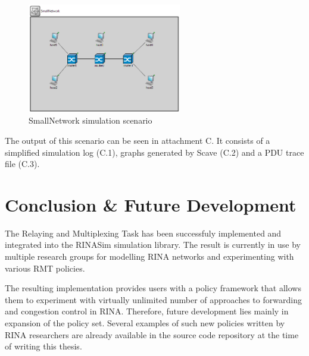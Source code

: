         \begin{figure}[H]
            \begin{center}
                \includegraphics[width=0.6\textwidth]{fig/examples-smallnetwork.png}
              \caption{SmallNetwork simulation scenario}
              \label{fig:examples:smallnetwork}
            \end{center}
        \end{figure}

        The output of this scenario can be seen in attachment C. It consists of a simplified simulation log (C.1), graphs generated by Scave (C.2) and a PDU trace file (C.3).


\chapter{Conclusion \& Future Development}\label{conclusion}

    The Relaying and Multiplexing Task has been successfuly implemented and integrated into the RINASim simulation library. The result is currently in use by multiple research groups for modelling RINA networks and experimenting with various RMT policies.

    The resulting implementation provides users with a policy framework that allows them to experiment with virtually unlimited number of approaches to forwarding and congestion control in RINA. Therefore, future development lies mainly in expansion of the policy set. Several examples of such new policies written by RINA researchers are already available in the source code repository at the time of writing this thesis.


